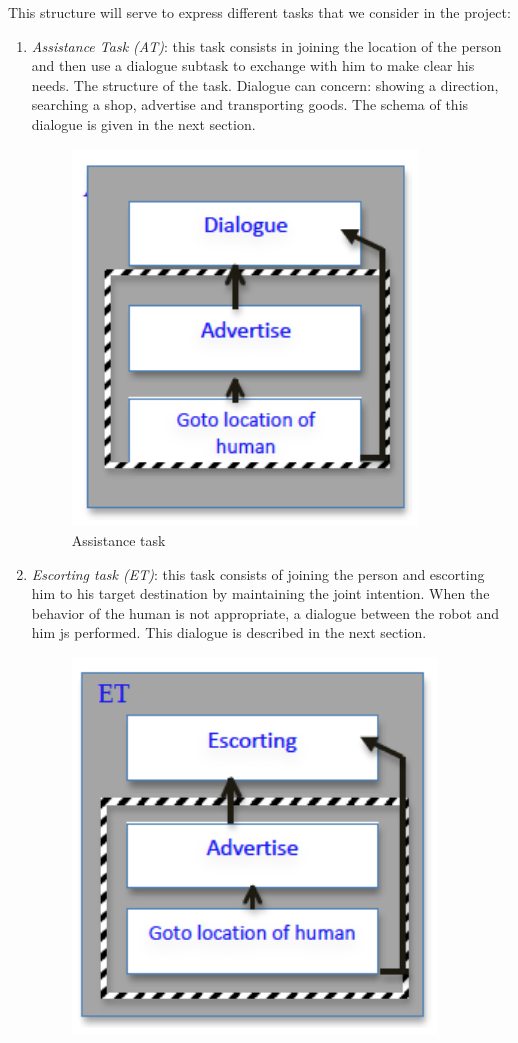 \documentclass{article}
\begin{document}
This structure will serve to express different tasks that we consider in the project: 
\begin{enumerate}
\item {\it Assistance Task (AT)}: this task consists in joining the location of the person and then use a dialogue subtask to exchange with him to make clear his needs. The structure of the task. Dialogue can concern: showing a direction, searching a shop, advertise and transporting goods. The schema of this dialogue is given in the next section.
\begin{figure}[htbp]
\begin{center}
\includegraphics[height=10cm]{fig/AssistanceTask}
\caption{Assistance task }
\label{FigAssistanceTask}
\end{center}
\end{figure}
\item {\it Escorting task (ET)}: this task consists of joining the person and escorting him to his target destination by maintaining the joint intention. When the behavior of the human is not appropriate, a dialogue between the robot and him js performed. This dialogue is described in the next section. 
\begin{figure}[htbp]
\begin{center}
\includegraphics[height=10cm]{fig/EscortingTask}

\end{center}
\end{figure}
\end{enumerate}
\end{document}

